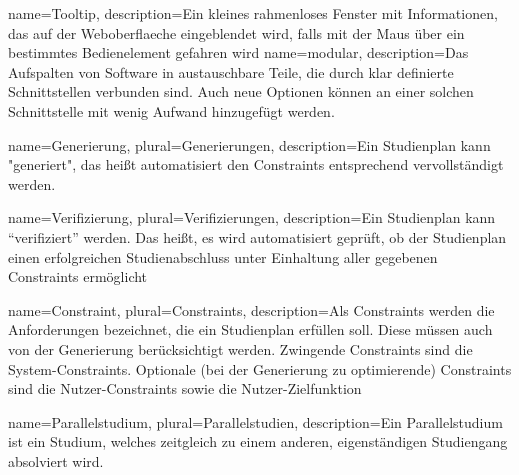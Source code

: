 {
	name=Tooltip,
	description={Ein kleines rahmenloses Fenster mit Informationen, das auf der \gls{Weboberflaeche} eingeblendet wird, falls mit der Maus über ein bestimmtes Bedienelement gefahren wird}
}
{
	name=modular,
	description={Das Aufspalten von Software in austauschbare Teile, die durch klar definierte Schnittstellen verbunden sind. Auch neue Optionen können an einer solchen Schnittstelle mit wenig Aufwand hinzugefügt werden.}
}
	
{
	name=Generierung,
	plural=Generierungen,
	description={Ein \gls{Studienplan} kann "generiert", das heißt automatisiert den \glspl{Constraint} entsprechend vervollständigt werden.}
}

{
name=Verifizierung,
plural=Verifizierungen,
description={Ein \gls{Studienplan} kann \enquote{verifiziert} werden. Das heißt, es wird automatisiert geprüft, ob der Studienplan einen erfolgreichen Studienabschluss unter Einhaltung aller gegebenen \glspl{Constraint} ermöglicht}
}

{
name=Constraint,
plural=Constraints,
description={Als Constraints werden die Anforderungen bezeichnet, die ein \gls{Studienplan} erfüllen soll. Diese müssen auch von der \gls{Generierung} berücksichtigt werden. Zwingende Constraints sind die \glspl{System-Constraint}. Optionale (bei der \gls{Generierung} zu optimierende) Constraints sind die \glspl{Nutzer-Constraint} sowie die \gls{Nutzer-Zielfunktion}}
}



{
name=Parallelstudium,
plural=Parallelstudien,
description={Ein Parallelstudium ist ein Studium, welches zeitgleich zu einem anderen, eigenständigen Studiengang absolviert wird.}
}